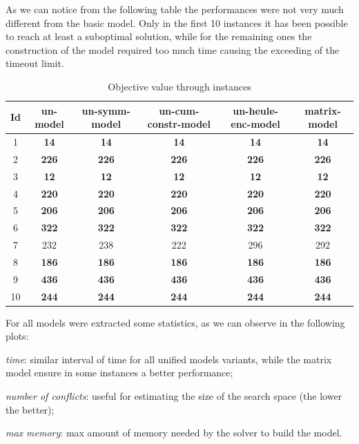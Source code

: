 As we can notice from the following table the performances were not very much different from the basic model. Only in the first 10 instances it has been possible to reach at least a suboptimal solution, while for the remaining ones the construction of the model required too much time causing the exceeding of the timeout limit.
\begin{table}[H]
    \centering
    \caption{Objective value through instances}
    \begin{tabular}{cccccc}
            \toprule
            Id & un-model & un-symm-model & un-cum-constr-model & un-heule-enc-model & matrix-model \\ 
            \midrule
            1 & \textbf{14} &       \textbf{14} &   \textbf{14} &   \textbf{14} &   \textbf{14} \\ 
            2 & \textbf{226} &      \textbf{226} &  \textbf{226} &  \textbf{226} &  \textbf{226} \\ 
            3 & \textbf{12} &       \textbf{12} &   \textbf{12} &   \textbf{12} &   \textbf{12} \\ 
            4 & \textbf{220} &      \textbf{220} &  \textbf{220} &  \textbf{220} &  \textbf{220} \\ 
            5 & \textbf{206} &      \textbf{206} &  \textbf{206} &  \textbf{206} &  \textbf{206} \\ 
            6 & \textbf{322} &      \textbf{322} &  \textbf{322} &  \textbf{322} &  \textbf{322} \\ 
            7 & 232 &       238 &   222 &   296 &   292 \\ 
            8 & \textbf{186} &      \textbf{186} &  \textbf{186} &  \textbf{186} &  \textbf{186} \\ 
            9 & \textbf{436} &      \textbf{436} &  \textbf{436} &  \textbf{436} &  \textbf{436} \\ 
            10 & \textbf{244} &     \textbf{244} &  \textbf{244} &  \textbf{244} &  \textbf{244} \\ 
            \bottomrule
    \end{tabular}
\end{table}

For all models were extracted some statistics, as we can observe in the following plots:
\begin{enumerate*}[label=(\roman*)]
    \item \textit{time}: similar interval of time for all unified models variants, while the matrix model ensure in some instances a better performance;
    \item \textit{number of conflicts}: useful for estimating the size of the search space (the lower the better);
    \item \textit{max memory}: max amount of memory needed by the solver to build the model.
\end{enumerate*}



